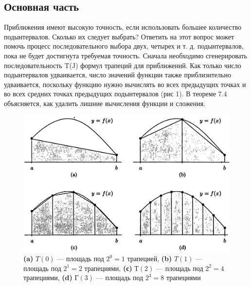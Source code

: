 \documentclass[14pt, titlepage, a4paper]{extarticle} %
\begin{document}
	
	\pagebreak
	
	
	\subsection*{Основная часть}
	
	
	Приближения имеют высокую точность, если использовать большее количество подынтервалов. Сколько их следует выбрать? Ответить на этот вопрос может помочь процесс последовательного
	выбора двух, четырех и т. д. подынтервалов, пока не будет достигнута требуемая точность. Сначала необходимо сгенерировать последовательность {T(J)} формул трапеций для приближений. Как только число подынтервалов удваивается, число значений функции также приблизительно удваивается, поскольку функцию нужно вычислять во всех предыдущих точках и во всех средних точках предыдущих подынтервалов (рис 1). В теореме 7.4 объясняется, как удалить лишние вычисления функции и сложения.
	
	\begin{figure}[h]
		\centering
		\includegraphics[width=400pt]{pic1.png}
		\caption{\textbf{(a)} $T(0)$ — площадь под $2^0 = 1$ трапецией, \textbf{(b)} $T(1)$ — площадь под		$2^1 = 2$ трапециями, \textbf{(с)} $Т(2)$ — площадь под $2^2 = 4$ трапециями, \textbf{(d)} $Г(3)$ — площадь под $2^3 = 8$ трапециями}
	\end{figure}
	
\end{document}
